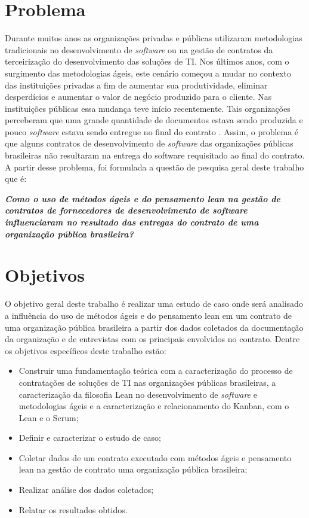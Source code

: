 \section[Problema]{Problema}

Durante muitos anos as organizações privadas e públicas utilizaram metodologias tradicionais no desenvolvimento de \textit{software} ou na gestão de contratos da terceirização do desenvolvimento das soluções de TI. Nos últimos anos, com o surgimento das metodologias ágeis, este cenário começou a mudar no contexto das instituições privadas a fim de aumentar sua produtividade, eliminar desperdícios e aumentar o valor de negócio produzido para o cliente. Nas instituições públicas essa mudança teve início recentemente. Tais organizações perceberam que uma grande quantidade de documentos estava sendo produzida e pouco \textit{software} estava sendo entregue no final do contrato \cite{TCU:2013}. Assim, o problema é que alguns contratos de desenvolvimento de \textit{software} das organizações públicas brasileiras não resultaram na entrega do software requisitado ao final do contrato. A partir desse problema, foi formulada a questão de pesquisa geral deste trabalho que é:

\textit{\textbf {Como o uso de métodos ágeis e do pensamento lean na gestão de contratos de fornecedores de desenvolvimento de \textit{software} influenciaram no resultado das entregas do contrato de uma organização pública brasileira?
}}

\section[Objetivos]{Objetivos}

O objetivo geral deste trabalho é realizar uma estudo de caso onde será analisado a influência do uso de métodos ágeis e do pensamento lean em um contrato de uma organização pública brasileira a partir dos dados coletados da documentação da organização e de entrevistas com os principais envolvidos no contrato. Dentre os objetivos específicos deste trabalho estão:

\begin{itemize}
\item Construir uma fundamentação teórica com a caracterização do processo de contratações de soluções de TI nas organizações públicas brasileiras, a caracterização da filosofia Lean no desenvolvimento de \textit{software} e metodologias ágeis e a caracterização e relacionamento do Kanban, com o Lean e o Scrum;
\item Definir e caracterizar o estudo de caso;
\item Coletar dados de um contrato executado com métodos ágeis e pensamento lean na gestão de contrato uma organização pública brasileira;
\item Realizar análise dos dados coletados;
\item Relatar os resultados obtidos.
\end{itemize}

